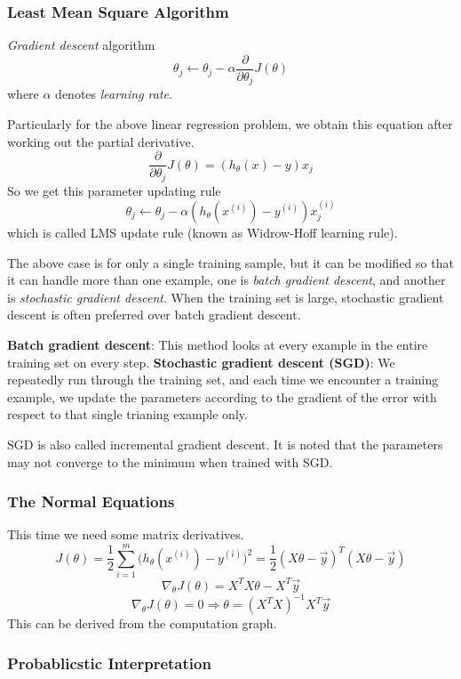 \subsubsection{Least Mean Square Algorithm}

 \emph{Gradient descent} algorithm
 \[ \theta_j \leftarrow \theta_j - \alpha \frac{\partial}{\partial \theta_j} J(\theta)\]
 where $\alpha$ denotes \emph{learning rate}.
 
 Particularly for the above linear regression problem, we obtain this equation
 after working out the partial derivative.
 \[ \frac{\partial}{\partial \theta_j} J(\theta) = (h_\theta(x) - y) x_j\]
 So we get this parameter updating rule
 \[ \theta_j \leftarrow \theta_j - \alpha  (h_\theta(x^{(i)}) - y^{(i)}) x_j^{(i)} \]
 which is called LMS update rule (known as Widrow-Hoff learning rule).
 
 The above case is for only a single training sample, but it can be modified
 so that it can handle more than one example, one is \emph{batch gradient descent}, and another
 is \emph{stochastic gradient descent}. When the training set is large, stochastic
 gradient descent is often preferred over batch gradient descent.
 
 {\bf Batch gradient descent}: This method looks at every example in the
 entire training set on every step.
 {\bf Stochastic gradient descent (SGD)}: We repeatedly run through the
 training set, and each time we encounter a training example, we update the
 parameters according to the gradient of the error with respect to that single
 trianing example only.

 SGD is also called incremental gradient descent. It is noted that
 the parameters may not converge to the minimum when trained with SGD.
 
 \subsubsection{The Normal Equations}
 
 This time we need some matrix derivatives.
 \[ J(\theta) = \frac{1}{2} \sum_{i=1}^m \big( h_\theta(x^{(i)}) - y^{(i)} \big)^2
 	= \frac{1}{2} (X\theta - \vec{y})^T(X\theta - \vec{y}) \]
 \[ \nabla_\theta J(\theta) = X^T X \theta - X^T \vec{y}\]
 \[ \nabla_\theta J(\theta) = 0 \Rightarrow \theta = (X^T X)^{-1} X^T \vec{y}\]
 This can be derived from the computation graph.

 \subsubsection{Probablicstic Interpretation}

